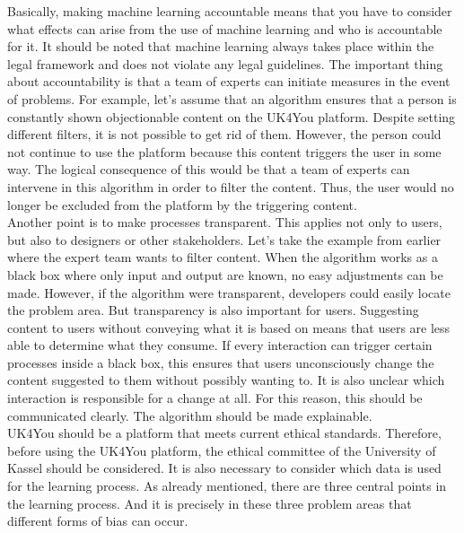 Basically, making machine learning accountable means that you have to consider what effects can arise from the use of machine learning and who is accountable for it.
It should be noted that machine learning always takes place within the legal framework and does not violate any legal guidelines.
The important thing about accountability is that a team of experts can initiate measures in the event of problems.
For example, let's assume that an algorithm ensures that a person is constantly shown objectionable content on the UK4You platform.
Despite setting different filters, it is not possible to get rid of them.
However, the person could not continue to use the platform because this content triggers the user in some way.
The logical consequence of this would be that a team of experts can intervene in this algorithm in order to filter the content.
Thus, the user would no longer be excluded from the platform by the triggering content.\\

Another point is to make processes transparent. 
This applies not only to users, but also to designers or other stakeholders.
Let's take the example from earlier where the expert team wants to filter content.
When the algorithm works as a black box where only input and output are known, no easy adjustments can be made.
However, if the algorithm were transparent, developers could easily locate the problem area.
But transparency is also important for users. 
Suggesting content to users without conveying what it is based on means that users are less able to determine what they consume.
If every interaction can trigger certain processes inside a black box, this ensures that users unconsciously change the content suggested to them without possibly wanting to.
It is also unclear which interaction is responsible for a change at all.
For this reason, this should be communicated clearly. 
The algorithm should be made explainable.\\

UK4You should be a platform that meets current ethical standards.
Therefore, before using the UK4You platform, the ethical committee of the University of Kassel should be considered.
It is also necessary to consider which data is used for the learning process.
As already mentioned, there are three central points in the learning process.
And it is precisely in these three problem areas that different forms of bias can occur\cite{framework-understanding-ml}.\\

